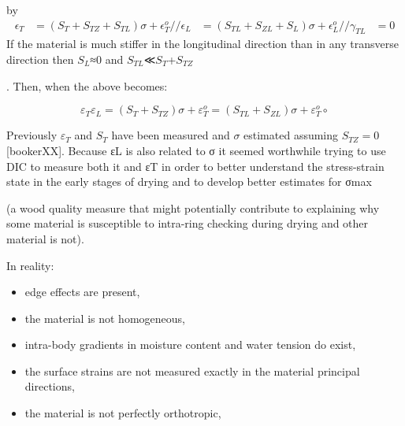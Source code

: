 by
\begin {eqnarray}
\epsilon_T &=(S_T+S_{TZ}+S_{TL})σ+\epsilon^o_T//
\epsilon_L &=(S_{TL}+S_{ZL}+S_L)σ+\epsilon^o_L//
\gamma_{TL} &=0
\end{eqnarray}
If the material is much stiffer in the longitudinal direction than in any transverse direction then $S_L$≈0
and $S_{TL}$≪$S_T$+$S_{TZ}$

. Then, when the above becomes:

$$\varepsilon_T \varepsilon_L = (S_T+S_{TZ})\sigma + \varepsilon^o_T = \left(S_{TL}+S_{ZL}\right) \sigma + \varepsilon^o_T∘$$

Previously $\varepsilon_T$ and $S_T$ have been measured and $\sigma$ estimated assuming $S_{TZ}=0$ [bookerXX]. Because εL is also related to σ it seemed worthwhile trying to use DIC to measure both it and εT in order to better understand the stress-strain state in the early stages of drying and to develop better estimates for σmax

(a wood quality measure that might potentially contribute to explaining why some material is susceptible to intra-ring checking during drying and other material is not).

In reality:

   \begin{itemize}
\item  edge effects are present,
\end{itemize}
\begin{itemize}
\item     the material is not homogeneous,
\end{itemize}
\begin{itemize}
\item     intra-body gradients in moisture content and water tension do exist,
\end{itemize}
\begin{itemize}
\item     the surface strains are not measured exactly in the material principal directions,
\end{itemize}
\begin{itemize}
\item     the material is not perfectly orthotropic,
\end{itemize}